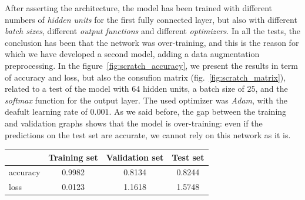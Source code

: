 \documentclass[11pt,a4paper,oneside]{article}
\begin{document}
After asserting the architecture, the model has been trained with different numbers of \textit{hidden units} for the first fully connected layer, but also with different \textit{batch sizes}, different \textit{output functions} and different \textit{optimizers}. 
In all the tests, the conclusion has been that the network was over-training, and this is the reason for which we have developed a second model, adding a data augmentation preprocessing. 
In the figure~\ref{fig:scratch_accuracy}, we present the results in term of accuracy and loss, but also the consufion matrix (fig.~\ref{fig:scratch_matrix}), related to a test of the model with $64$ hidden units, a batch size of $25$, and the \textit{softmax} function for the output layer. 
The used optimizer was \textit{Adam}, with the deafult learning rate of $0.001$. As we said before, the gap between the training and validation graphs shows that the model is over-training: even if the predictions on the test set are accurate, we cannot rely on this network as it is.

\begin{center}
\begin{tabular}{|l|ccc|}
\hline
 & Training set & Validation set & Test set \\
\hline
accuracy & 0.9982 & 0.8134 & 0.8244 \\
loss & 0.0123 & 1.1618 & 1.5748 \\
\hline
\end{tabular}
\end{center}
\end{document}
